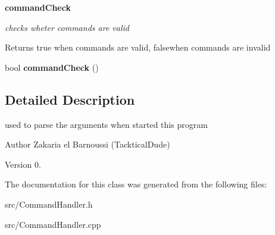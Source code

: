 \begin{Indent}{\bf command\+Check}\par
{\em checks wheter commands are valid

\begin{DoxyReturn}{Returns}
true when commands are valid, falsewhen commands are invalid 
\end{DoxyReturn}
}\begin{DoxyCompactItemize}
\item 
\hypertarget{class_command_handler_a3411c0c04dd7740b0d18fbf7b59fa669}{}bool {\bfseries command\+Check} ()\label{class_command_handler_a3411c0c04dd7740b0d18fbf7b59fa669}

\end{DoxyCompactItemize}
\end{Indent}


\subsection{Detailed Description}
used to parse the arguments when started this program 

\begin{DoxyAuthor}{Author}
Zakaria el Barnoussi (Tacktical\+Dude) 
\end{DoxyAuthor}
\begin{DoxyVersion}{Version}
0. 
\end{DoxyVersion}


The documentation for this class was generated from the following files\+:\begin{DoxyCompactItemize}
\item 
src/Command\+Handler.\+h\item 
src/Command\+Handler.\+cpp\end{DoxyCompactItemize}
